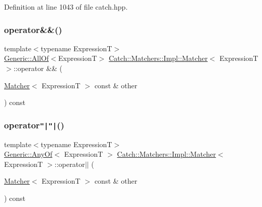 Definition at line 1043 of file catch.\+hpp.

\hypertarget{struct_catch_1_1_matchers_1_1_impl_1_1_matcher_adb060f348e3ed404b80209fbc62174e1}{}\label{struct_catch_1_1_matchers_1_1_impl_1_1_matcher_adb060f348e3ed404b80209fbc62174e1} 
\subsubsection{\texorpdfstring{operator\&\&()}{operator\&\&()}}
{\footnotesize\ttfamily template$<$typename ExpressionT$>$ \\
\hyperlink{class_catch_1_1_matchers_1_1_impl_1_1_generic_1_1_all_of}{Generic\+::\+All\+Of}$<$ExpressionT$>$ \hyperlink{struct_catch_1_1_matchers_1_1_impl_1_1_matcher}{Catch\+::\+Matchers\+::\+Impl\+::\+Matcher}$<$ ExpressionT $>$\+::operator \&\& (\begin{DoxyParamCaption}\item[{\hyperlink{struct_catch_1_1_matchers_1_1_impl_1_1_matcher}{Matcher}$<$ ExpressionT $>$ const \&}]{other }\end{DoxyParamCaption}) const}

\hypertarget{struct_catch_1_1_matchers_1_1_impl_1_1_matcher_a55b1e12315e7a5daf7ce7a11ddfaa295}{}\label{struct_catch_1_1_matchers_1_1_impl_1_1_matcher_a55b1e12315e7a5daf7ce7a11ddfaa295} 
\subsubsection{\texorpdfstring{operator\texttt{"|}\texttt{"|}()}{operator||()}}
{\footnotesize\ttfamily template$<$typename ExpressionT$>$ \\
\hyperlink{class_catch_1_1_matchers_1_1_impl_1_1_generic_1_1_any_of}{Generic\+::\+Any\+Of}$<$ ExpressionT $>$ \hyperlink{struct_catch_1_1_matchers_1_1_impl_1_1_matcher}{Catch\+::\+Matchers\+::\+Impl\+::\+Matcher}$<$ ExpressionT $>$\+::operator$\vert$$\vert$ (\begin{DoxyParamCaption}\item[{\hyperlink{struct_catch_1_1_matchers_1_1_impl_1_1_matcher}{Matcher}$<$ ExpressionT $>$ const \&}]{other }\end{DoxyParamCaption}) const}



